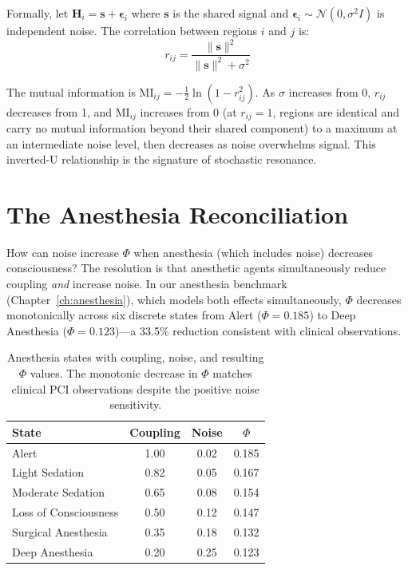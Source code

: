 \documentclass[12pt]{book}
\begin{document}
Formally, let $\mathbf{H}_i = \mathbf{s} + \boldsymbol{\epsilon}_i$ where $\mathbf{s}$ is the shared signal and $\boldsymbol{\epsilon}_i \sim \mathcal{N}(0, \sigma^2 I)$ is independent noise. The correlation between regions $i$ and $j$ is:
\begin{equation}
r_{ij} = \frac{\|\mathbf{s}\|^2}{\|\mathbf{s}\|^2 + \sigma^2}
\end{equation}

The mutual information is $\text{MI}_{ij} = -\frac{1}{2}\ln(1 - r_{ij}^2)$. As $\sigma$ increases from 0, $r_{ij}$ decreases from 1, and $\text{MI}_{ij}$ increases from 0 (at $r_{ij} = 1$, regions are identical and carry no mutual information beyond their shared component) to a maximum at an intermediate noise level, then decreases as noise overwhelms signal. This inverted-U relationship is the signature of stochastic resonance.

\section{The Anesthesia Reconciliation}

How can noise increase $\Phi$ when anesthesia (which includes noise) decreases consciousness? The resolution is that anesthetic agents simultaneously reduce coupling \textit{and} increase noise. In our anesthesia benchmark (Chapter~\ref{ch:anesthesia}), which models both effects simultaneously, $\Phi$ decreases monotonically across six discrete states from Alert ($\Phi = 0.185$) to Deep Anesthesia ($\Phi = 0.123$)---a 33.5\% reduction consistent with clinical observations.

\begin{table}[H]
\centering
\caption{Anesthesia states with coupling, noise, and resulting $\Phi$ values. The monotonic decrease in $\Phi$ matches clinical PCI observations despite the positive noise sensitivity.}
\label{tab:anesthesia-states}
\begin{tabular}{lccc}
\toprule
\textbf{State} & \textbf{Coupling} & \textbf{Noise} & \textbf{$\Phi$} \\
\midrule
Alert & 1.00 & 0.02 & 0.185 \\
Light Sedation & 0.82 & 0.05 & 0.167 \\
Moderate Sedation & 0.65 & 0.08 & 0.154 \\
Loss of Consciousness & 0.50 & 0.12 & 0.147 \\
Surgical Anesthesia & 0.35 & 0.18 & 0.132 \\
Deep Anesthesia & 0.20 & 0.25 & 0.123 \\
\bottomrule
\end{tabular}
\end{table}
\end{document}
